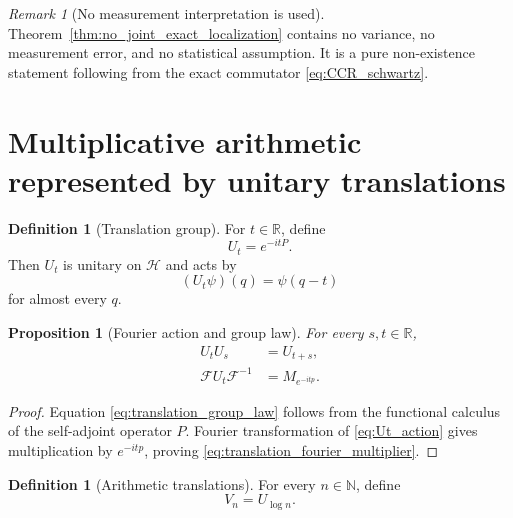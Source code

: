 \documentclass[11pt]{amsart}
\numberwithin{equation}{section}
\theoremstyle{plain}
\newtheorem{proposition}[theorem]{Proposition}
\theoremstyle{definition}
\newtheorem{definition}[theorem]{Definition}
\theoremstyle{remark}
\newtheorem{remark}[theorem]{Remark}
\newcommand{\R}{\mathbb{R}}
\newcommand{\N}{\mathbb{N}}
\newcommand{\Hil}{\mathcal{H}}
\newcommand{\Four}{\mathcal{F}}
\begin{document}
\begin{remark}[No measurement interpretation is used]
\label{rem:no_measurement_interpretation}
Theorem~\ref{thm:no_joint_exact_localization} contains no variance, no
measurement error, and no statistical assumption.  It is a pure
non-existence statement following from the exact commutator
\eqref{eq:CCR_schwartz}.
\end{remark}

\section{Multiplicative arithmetic represented by unitary translations}
\label{sec:unitary_arithmetic}

\begin{definition}[Translation group]
\label{def:translation_group}
For $t\in\R$, define
\begin{equation}
U_t=e^{-itP}.
\label{eq:Ut_definition}
\end{equation}
Then $U_t$ is unitary on $\Hil$ and acts by
\begin{equation}
(U_t\psi)(q)=\psi(q-t)
\label{eq:Ut_action}
\end{equation}
for almost every $q$.
\end{definition}

\begin{proposition}[Fourier action and group law]
\label{prop:translation_properties}
For every $s,t\in\R$,
\begin{align}
U_tU_s
&=U_{t+s},
\label{eq:translation_group_law}\\
\Four U_t\Four^{-1}
&=M_{e^{-itp}}.
\label{eq:translation_fourier_multiplier}
\end{align}
\end{proposition}

\begin{proof}
Equation \eqref{eq:translation_group_law} follows from the functional
calculus of the self-adjoint operator $P$.  Fourier transformation of
\eqref{eq:Ut_action} gives multiplication by $e^{-itp}$, proving
\eqref{eq:translation_fourier_multiplier}.
\end{proof}

\begin{definition}[Arithmetic translations]
\label{def:arithmetic_translations}
For every $n\in\N$, define
\begin{equation}
V_n=U_{\log n}.
\label{eq:Vn_definition}
\end{equation}
\end{definition}
\end{document}
